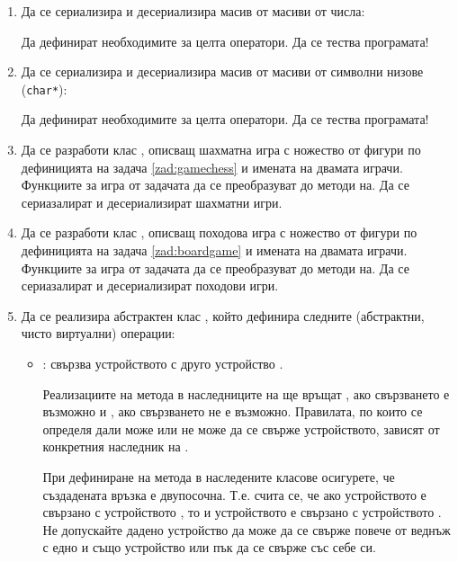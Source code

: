 \begin{enumerate}[resume]

	\item Да се сериализира и десериализира масив от масиви от числа:


	Да дефинират необходимите за целта оператори. Да се тества програмата!

	\item Да се сериализира и десериализира масив от масиви от символни низове (\texttt{char*}):


	Да дефинират необходимите за целта оператори. Да се тества програмата!

  \item \label{zad:gamechess2}Да се разработи клас , описващ шахматна игра с ножество от фигури по дефиницията на задача \ref{zad:gamechess} и имената на двамата играчи. Функциите за игра от задачата да се преобразуват до методи на. Да се сериазалират и десериализират шахматни игри.

  \item \label{zad:boardgame2}Да се разработи клас , описващ походова игра с ножество от фигури по дефиницията на задача \ref{zad:boardgame} и имената на двамата играчи. Функциите за игра от задачата да се преобразуват до методи на. Да се сериазалират и десериализират походови игри.

	\item \label{zad:network}Да се реализира абстрактен клас , който дефинира следните (абстрактни, чисто виртуални) операции:

	\begin{itemize}
		\item {}: свързва устройството с друго устройство .

		Реализациите на метода в наследниците на  ще връщат , ако свързването е възможно и , ако свързването не е възможно.  Правилата, по които се определя дали може или не може да се свърже устройството, зависят от конкретния наследник на .

		При дефиниране на метода в наследените класове осигурете, че създадената връзка е двупосочна. Т.е. счита се, че ако устройството  е свързано с устройството , то и устройството  е свързано с устройството . Не допускайте дадено устройство да може да се свърже повече от веднъж с едно и също устройство или пък да се свърже със себе си.


\end{itemize}
\end{enumerate}
